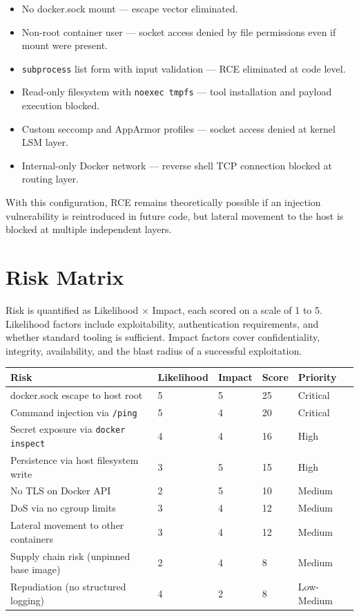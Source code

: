 \begin{itemize}
    \item No docker.sock mount --- escape vector eliminated.
    \item Non-root container user --- socket access denied by file permissions even if mount were present.
    \item \texttt{subprocess} list form with input validation --- RCE eliminated at code level.
    \item Read-only filesystem with \texttt{noexec tmpfs} --- tool installation and payload execution blocked.
    \item Custom seccomp and AppArmor profiles --- socket access denied at kernel LSM layer.
    \item Internal-only Docker network --- reverse shell TCP connection blocked at routing layer.
\end{itemize}

With this configuration, RCE remains theoretically possible if an injection vulnerability is reintroduced in future code, but lateral movement to the host is blocked at multiple independent layers.


\section{Risk Matrix}

Risk is quantified as Likelihood $\times$ Impact, each scored on a scale of 1 to 5. Likelihood factors include exploitability, authentication requirements, and whether standard tooling is sufficient. Impact factors cover confidentiality, integrity, availability, and the blast radius of a successful exploitation.

\begin{center}
\begin{tabular}{p{4.5cm}p{1.5cm}p{1.5cm}p{1.5cm}p{2cm}}
\hline
\textbf{Risk} & \textbf{Likelihood} & \textbf{Impact} & \textbf{Score} & \textbf{Priority} \\
\hline
docker.sock escape to host root & 5 & 5 & 25 & Critical \\
Command injection via \texttt{/ping} & 5 & 4 & 20 & Critical \\
Secret exposure via \texttt{docker inspect} & 4 & 4 & 16 & High \\
Persistence via host filesystem write & 3 & 5 & 15 & High \\
No TLS on Docker API & 2 & 5 & 10 & Medium \\
DoS via no cgroup limits & 3 & 4 & 12 & Medium \\
Lateral movement to other containers & 3 & 4 & 12 & Medium \\
Supply chain risk (unpinned base image) & 2 & 4 & 8 & Medium \\
Repudiation (no structured logging) & 4 & 2 & 8 & Low-Medium \\
\hline
\end{tabular}
\end{center}


